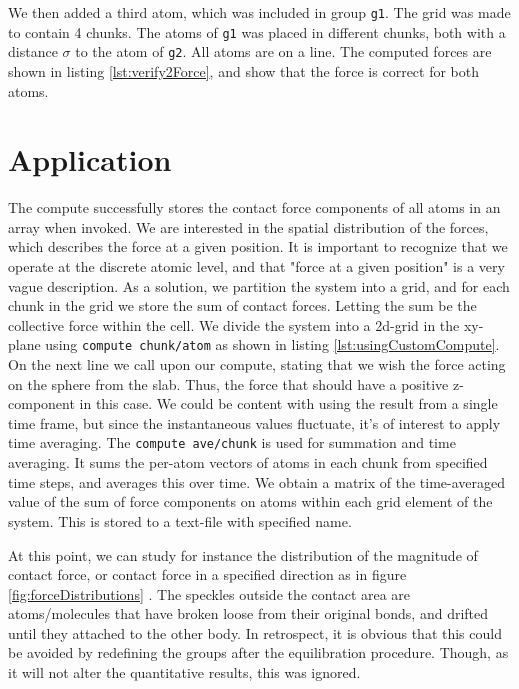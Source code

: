 \documentclass[twoside,english]{uiofysmaster}
\begin{document}
We then added a third atom, which was included in group \texttt{g1}. 
The grid was made to contain 4 chunks.
The atoms of \texttt{g1} was placed in different chunks, both with a distance $\sigma$ to the atom of \texttt{g2}. 
All atoms are on a line.
The computed forces are shown in listing \ref{lst:verify2Force}, and show that the force is correct for both atoms.



\section{Application}
The compute successfully stores the contact force components of all atoms in an array when invoked. 
We are interested in the spatial distribution of the forces, which describes the force at a given position. 
It is important to recognize that we operate at the discrete atomic level, and that "force at a given position" is a very vague description. 
As a solution, we partition the system into a grid, and for each chunk in the grid we store the sum of contact forces. Letting the sum be the collective force within the cell.
We divide the system into a 2d-grid in the xy-plane using  \texttt{compute chunk/atom} as shown in listing \ref{lst:usingCustomCompute}.
On the next line we call upon our compute, stating that we wish the force acting on the sphere from the slab. 
Thus, the force that should have a positive z-component in this case. 
We could be content with using the result from a single time frame, but since the instantaneous values fluctuate, it's of interest to apply time averaging. 
The \texttt{compute ave/chunk} is used for summation and time averaging.  
It sums the  per-atom vectors of atoms in each chunk from specified time steps, and averages this over time. 
We obtain a matrix of the time-averaged value of the sum of force components on atoms within each grid element of the system.
This is stored to a text-file with specified name. 

At this point, we can study for instance the distribution of the magnitude of contact force, or contact force in a specified direction as in figure \ref{fig:forceDistributions} .
The speckles outside the contact area are atoms/molecules that have broken loose from their original bonds, and drifted until they attached to the other body. 
In retrospect, it is obvious that this could be avoided by redefining the groups after the equilibration procedure.
Though, as it will not alter the quantitative results, this was ignored.
\end{document}
